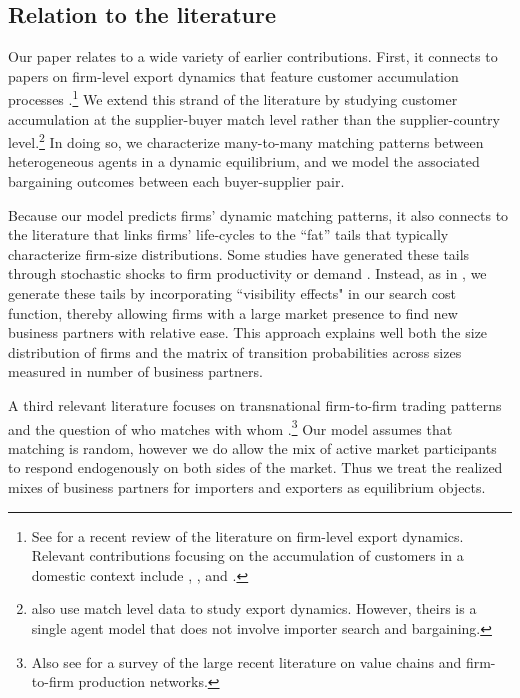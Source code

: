 \documentclass[12pt]{article} \usepackage{amsmath,amssymb,amsthm,geometry,graphicx,setspace,algorithm,algpseudocode,float}
\newcommand{\quotes}[1]{``#1''}
\begin{document}
\subsection{Relation to the literature}
Our paper relates to a wide variety of earlier contributions. First, it connects to papers on firm-level export dynamics that feature customer accumulation processes \citep{albornoz2012sequential, drozd2012understanding, eaton2014a, chaney2014the, CarballoOttavianovolumepe2018,
piveteau2019,  RodrigueTan2019,fitzgerald2019exporters}.\footnote{See \citet{AlessandriaArkolakisRuhl2020} for a recent review of the literature on firm-level export dynamics. Relevant contributions focusing on the accumulation of customers in a domestic context include \citet{foster2015slow},  \citet{gourio2014customer}, and \citet{BoehmOberfieldetal2024}.\medskip}  We extend this strand of the literature by studying customer accumulation at the supplier-buyer match level rather than the supplier-country level.\footnote{\citet{eaton2014a} also use match level data to study export dynamics. However, theirs is a single agent model that does not involve importer search and bargaining.\medskip} In doing so, we characterize many-to-many matching patterns between heterogeneous agents in a dynamic equilibrium, and we model the associated bargaining outcomes between each buyer-supplier pair.
\par
Because our model predicts firms' dynamic matching patterns, it also connects to the literature that links firms' life-cycles to the \quotes{fat} tails that typically characterize firm-size distributions. Some studies have generated these tails through stochastic shocks to firm productivity or demand \citep{luttmer2007selection, luttmer2011mechanics, arkolakis2016unified,GumpertLiMoxnesRamondoTintelnot2019, BoehmOberfieldetal2024}. Instead, as in \cite{eaton2014a}, we generate these tails by incorporating ``visibility effects" in our search cost function, thereby allowing firms with a large market presence to find new business partners with relative ease. This approach explains well both the size distribution of firms and the matrix of transition probabilities across sizes measured in number of business partners.  

A third relevant literature focuses on transnational firm-to-firm trading patterns and the question of who matches with whom \citep{rauch2001business,rauch2002ethnic,BernardMoxnesUlltveit2016,BernardDhyneEtc2019,Benguria2021, Monarch2022,sugita2014assortative,EatonKortumKramarzII2018}.\footnote{Also see \cite{AntrasChor2021} for a survey of the large recent literature on value chains and firm-to-firm production networks.\medskip} Our model assumes that matching is random, however we do allow the mix of active market participants to respond endogenously on both sides of the market. Thus we treat the realized mixes of business partners for importers and exporters as equilibrium objects.
\end{document}
